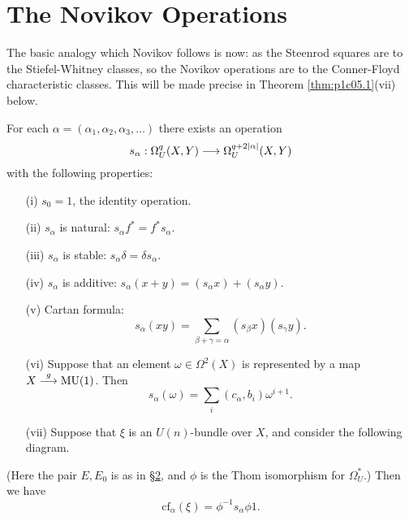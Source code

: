 \documentclass[../main]{subfiles}
\begin{document}
\label{sec:p1c5}

\chapter{The Novikov Operations}
The basic analogy which Novikov follows is now: as the Steenrod squares are to the Stiefel-Whitney classes, so the Novikov operations are to the Conner-Floyd characteristic classes. This will be made precise in Theorem \ref{thm:p1c05.1}(vii) below.

\begin{theorem}[S.P. Novikov]
\label{thm:p1c05.1}
For each $\alpha = (\alpha_1, \alpha_2, \alpha_3, \ldots)$ there exists an operation $$s_\alpha : \Omega_U^q(X, Y) \overset{}{\longrightarrow} \Omega_U^{q + 2|\alpha|} (X, Y)$$ with the following properties:

\begin{enumerate}
	\item[(i)] $s_0 = 1$, the identity operation.
	\item[(ii)] $s_\alpha$ is natural: $s_\alpha f^\ast = f^\ast s_\alpha$.
	\item[(iii)] $s_\alpha$ is stable: $s_\alpha \delta = \delta s_\alpha$.
	\item[(iv)] $s_\alpha$ is additive: $s_\alpha (x + y) = (s_\alpha x) + (s_\alpha y).$
	\item[(v)] Cartan formula: $$s_\alpha(xy) = \sum_{\beta + \gamma = \alpha} (s_\beta x) (s_\gamma y).$$ 
	\item[(vi)] Suppose that an element $\omega \in \Omega^2(X)$ is represented by a map $X \overset{g}{\longrightarrow} \mathrm{MU}(1)$. Then $$s_\alpha(\omega) = \sum_i (c_\alpha, b_i) \omega^{i + 1}.$$
	\item[(vii)] Suppose that $\xi$ is an $U(n)$-bundle over $X$, and consider the following diagram.
\end{enumerate}

\begin{center}
\end{center}

(Here the pair $E, E_0$ is as in \hyperref[sec:p1c2]{\S 2}, and $\phi$ is the Thom isomorphism for $\Omega_U^\ast$.) Then we have $$\mathrm{cf}_\alpha(\xi) = \phi^{-1} s_\alpha \phi 1.$$
\end{theorem}
\end{document}
